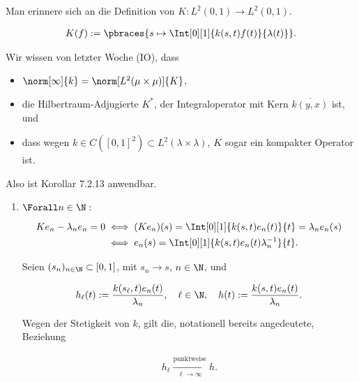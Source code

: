 \begin{solution}

Man erinnere sich an die Definition von $K: L^2(0, 1) \to L^2(0, 1)$.

\begin{align*}
  K(f) :=
  \pbraces
  {
    s
    \mapsto
    \Int[0][1]{k(s, t)f(t)}{\lambda(t)}
  }.
\end{align*}

Wir wissen von letzter Woche (IO), dass

\begin{itemize}

  \item
  $\norm[\infty]{k} = \norm[L^2(\mu \times \mu)]{K}$,

  \item
  die Hilbertraum-Adjugierte $K^\ast$, der Integraloperator mit Kern $\overline{k(y,x)}$ ist, und

  \item
  dass wegen $k \in C([0, 1]^2) \subset L^2(\lambda \times \lambda)$, $K$ sogar ein kompakter Operator ist.

\end{itemize}


Also ist Korollar 7.2.13 anwendbar.

\begin{enumerate}[label = (\alph*)]

  \item
  $\Forall n \in \N:$

  \begin{align*}
    K e_n - \lambda_n e_n = 0
    & \iff
    (K e_n)(s)
    =
    \Int[0][1]{k(s, t)e_n(t)}{t}
    =
    \lambda_n e_n(s) \\
    & \iff
    e_n(s)
    =
    \Int[0][1]
    {k(s, t) e_n(t) \lambda_n^{-1}}{t}.
  \end{align*}

  Seien $(s_n)_{n \in \N} \subset [0, 1]$, mit $s_n \to s$, $n \in \N$, und

  \begin{align*}
    h_\ell(t)
    :=
    \frac{k(s_\ell, t) e_n(t)}{\lambda_n},
    \quad
    \ell \in \N,
    \quad
    h(t)
    :=
    \frac{k(s, t) e_n(t)}{\lambda_n}.
  \end{align*}

  Wegen der Stetigkeit von $k$, gilt die, notationell bereits angedeutete, Beziehung

  \begin{align*}
    h_\ell
    \xrightarrow
    [\ell \to \infty]
    {\text{punktweise}}
    h.
  \end{align*}


\end{enumerate}
\end{solution}
